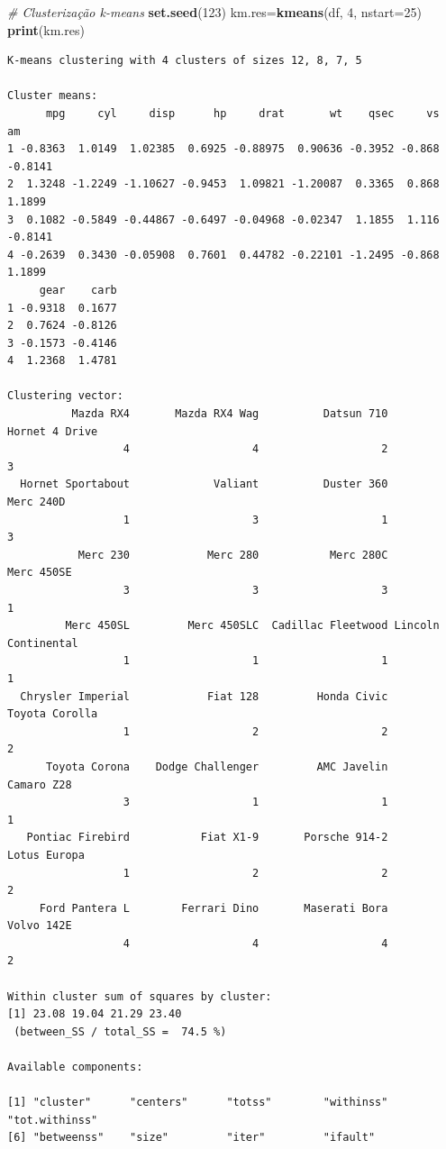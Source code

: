 \documentclass[12pt,brazil,oneside]{book}
\newenvironment{Shaded}{\begin{snugshade}}{\end{snugshade}}
\newcommand{\CommentTok}[1]{\textcolor[rgb]{0.56,0.35,0.01}{\textit{#1}}}
\newcommand{\DataTypeTok}[1]{\textcolor[rgb]{0.13,0.29,0.53}{#1}}
\newcommand{\DecValTok}[1]{\textcolor[rgb]{0.00,0.00,0.81}{#1}}
\newcommand{\KeywordTok}[1]{\textcolor[rgb]{0.13,0.29,0.53}{\textbf{#1}}}
\newcommand{\NormalTok}[1]{#1}
\begin{document}
\begin{Shaded}
\begin{Highlighting}[]
\CommentTok{# Clusterização k-means}
\KeywordTok{set.seed}\NormalTok{(}\DecValTok{123}\NormalTok{)}
\NormalTok{km.res=}\KeywordTok{kmeans}\NormalTok{(df, }\DecValTok{4}\NormalTok{, }\DataTypeTok{nstart=}\DecValTok{25}\NormalTok{)}
\KeywordTok{print}\NormalTok{(km.res)}
\end{Highlighting}
\end{Shaded}

\begin{verbatim}
K-means clustering with 4 clusters of sizes 12, 8, 7, 5

Cluster means:
      mpg     cyl     disp      hp     drat       wt    qsec     vs      am
1 -0.8363  1.0149  1.02385  0.6925 -0.88975  0.90636 -0.3952 -0.868 -0.8141
2  1.3248 -1.2249 -1.10627 -0.9453  1.09821 -1.20087  0.3365  0.868  1.1899
3  0.1082 -0.5849 -0.44867 -0.6497 -0.04968 -0.02347  1.1855  1.116 -0.8141
4 -0.2639  0.3430 -0.05908  0.7601  0.44782 -0.22101 -1.2495 -0.868  1.1899
     gear    carb
1 -0.9318  0.1677
2  0.7624 -0.8126
3 -0.1573 -0.4146
4  1.2368  1.4781

Clustering vector:
          Mazda RX4       Mazda RX4 Wag          Datsun 710      Hornet 4 Drive 
                  4                   4                   2                   3 
  Hornet Sportabout             Valiant          Duster 360           Merc 240D 
                  1                   3                   1                   3 
           Merc 230            Merc 280           Merc 280C          Merc 450SE 
                  3                   3                   3                   1 
         Merc 450SL         Merc 450SLC  Cadillac Fleetwood Lincoln Continental 
                  1                   1                   1                   1 
  Chrysler Imperial            Fiat 128         Honda Civic      Toyota Corolla 
                  1                   2                   2                   2 
      Toyota Corona    Dodge Challenger         AMC Javelin          Camaro Z28 
                  3                   1                   1                   1 
   Pontiac Firebird           Fiat X1-9       Porsche 914-2        Lotus Europa 
                  1                   2                   2                   2 
     Ford Pantera L        Ferrari Dino       Maserati Bora          Volvo 142E 
                  4                   4                   4                   2 

Within cluster sum of squares by cluster:
[1] 23.08 19.04 21.29 23.40
 (between_SS / total_SS =  74.5 %)

Available components:

[1] "cluster"      "centers"      "totss"        "withinss"     "tot.withinss"
[6] "betweenss"    "size"         "iter"         "ifault"      
\end{verbatim}
\end{document}

